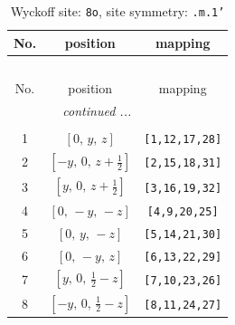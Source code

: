 \documentclass[fleqn,8pt]{jsarticle}
\begin{document}
\renewcommand{\arraystretch}{1.2}
\begin{longtable}{ccc}
\caption{Wyckoff site: {\tt 8o}, site symmetry: {\tt .m.1'}}
 \\
 \hline \hline
No. & position & mapping \\ \hline \endfirsthead

\multicolumn{2}{l}{\tablename\ \thetable{}} \\
 \hline \hline
No. & position & mapping \\ \hline \endhead

 \hline \hline
\multicolumn{2}{r}{\footnotesize\it continued ...} \\ \endfoot

 \hline \hline
\multicolumn{2}{r}{} \\ \endlastfoot

1 & $\left[ 0,\, y,\, z \right]$ & {\tt [1,12,17,28]} \\ \hline
2 & $\left[ - y,\, 0,\, z + \frac{1}{2} \right]$ & {\tt [2,15,18,31]} \\ \hline
3 & $\left[ y,\, 0,\, z + \frac{1}{2} \right]$ & {\tt [3,16,19,32]} \\ \hline
4 & $\left[ 0,\, - y,\, - z \right]$ & {\tt [4,9,20,25]} \\ \hline
5 & $\left[ 0,\, y,\, - z \right]$ & {\tt [5,14,21,30]} \\ \hline
6 & $\left[ 0,\, - y,\, z \right]$ & {\tt [6,13,22,29]} \\ \hline
7 & $\left[ y,\, 0,\, \frac{1}{2} - z \right]$ & {\tt [7,10,23,26]} \\ \hline
8 & $\left[ - y,\, 0,\, \frac{1}{2} - z \right]$ & {\tt [8,11,24,27]} \\
\end{longtable}
\renewcommand{\arraystretch}{1.2}
\end{document}
